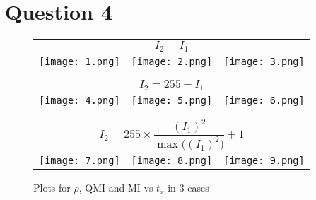 \documentclass[12pt]{article}
\begin{document}
\section{Question 4}
\begin{figure}[H]
    \centering
    \begin{tabular}{ccc}
    \multicolumn{3}{c}{$I_2 = I_1$        } \\[0.5em]
        \texttt{[image: 1.png]} &
        \texttt{[image: 2.png]} &
        \texttt{[image: 3.png]} \\
        \\ \\
        \multicolumn{3}{c}{$I_2 = 255 - I_1$        } \\[0.5em]
        
        \texttt{[image: 4.png]} &
        \texttt{[image: 5.png]} &
        \texttt{[image: 6.png]} \\
        \\ \\
        \multicolumn{3}{c}{\[
I_{2} = 255 \times \frac{(I_{1})^{2}}{\max \big((I_{1})^{2}\big)} + 1
\]} \\[0.5em]
        
        \texttt{[image: 7.png]} &
        \texttt{[image: 8.png]} &
        \texttt{[image: 9.png]} \\
    \end{tabular}
    \caption*{Plots for $\rho$, QMI and MI vs $t_x$ in 3 cases}
\end{figure}
\end{document}
